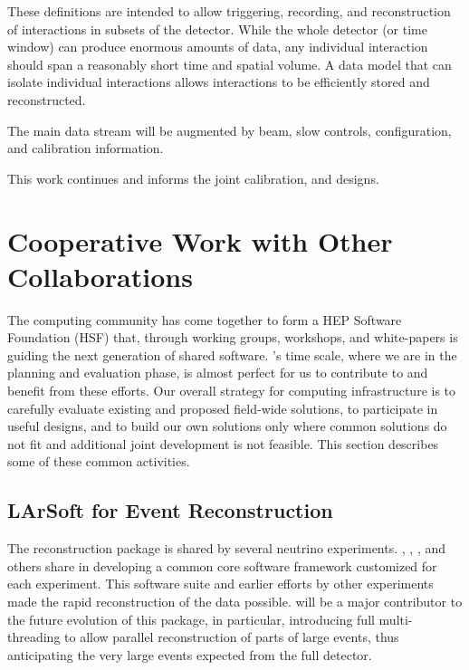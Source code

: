 These definitions are intended to allow triggering, recording, and reconstruction of interactions in subsets of the detector. While the whole detector (or time window) can produce enormous amounts of data, any individual interaction should span a reasonably short time and spatial volume. A data model that can isolate individual interactions  allows interactions to be efficiently stored and reconstructed. 


The main data stream will be augmented by beam, slow controls,  configuration, and calibration information. 

This work continues and informs  the  joint  calibration,  and  designs.


\section{Cooperative Work with Other Collaborations}
\label{ch:exec-comp-gov-coop}

The  computing community has come together to form a HEP Software Foundation (HSF)\cite{Alves:2017she} that, through working groups, workshops, and white-papers is guiding the next generation of shared  software.  's time scale, where we are in the planning and evaluation phase, is almost perfect for us to contribute to and benefit from these efforts.  Our overall strategy for computing infrastructure is to carefully evaluate existing and proposed field-wide solutions, to participate in useful designs, and to build our own solutions only where common solutions do not fit and additional joint development is not feasible.   This section describes some of these common activities. 



\subsection{LArSoft for Event Reconstruction}

The \cite{Snider:2017wjd} reconstruction package is shared by several  neutrino experiments.  , , , and others share in developing a common core software framework customized for each experiment. This software suite and earlier efforts by other experiments made the rapid reconstruction of the  data possible.   will be a major contributor to  the future evolution of this package, in particular, introducing full multi-threading to allow parallel reconstruction of parts of large events, thus anticipating the very large events expected from the full detector. 

